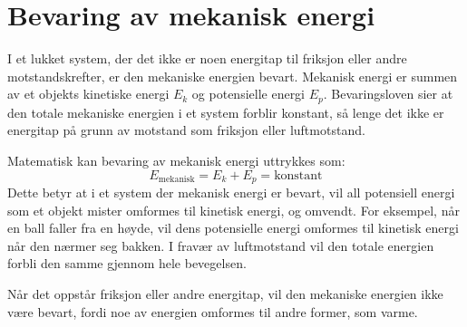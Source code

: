 \section{Bevaring av mekanisk energi}

I et lukket system, der det ikke er noen energitap til friksjon eller andre motstandskrefter, er den mekaniske energien bevart. Mekanisk energi er summen av et objekts kinetiske energi \( E_k \) og potensielle energi \( E_p \). Bevaringsloven sier at den totale mekaniske energien i et system forblir konstant, så lenge det ikke er energitap på grunn av motstand som friksjon eller luftmotstand.

Matematisk kan bevaring av mekanisk energi uttrykkes som:
\[
E_{\text{mekanisk}} = E_k + E_p = \text{konstant}
\]
Dette betyr at i et system der mekanisk energi er bevart, vil all potensiell energi som et objekt mister omformes til kinetisk energi, og omvendt. For eksempel, når en ball faller fra en høyde, vil dens potensielle energi omformes til kinetisk energi når den nærmer seg bakken. I fravær av luftmotstand vil den totale energien forbli den samme gjennom hele bevegelsen.

Når det oppstår friksjon eller andre energitap, vil den mekaniske energien ikke være bevart, fordi noe av energien omformes til andre former, som varme.


